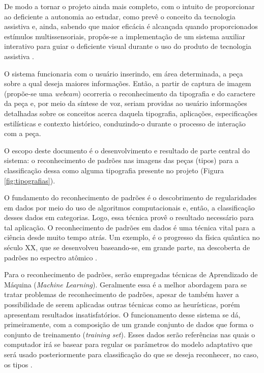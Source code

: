 De modo a tornar o projeto ainda mais completo, com o intuito de proporcionar ao deficiente a autonomia ao estudar, como prevê o conceito da tecnologia assistiva e, ainda, sabendo que maior eficácia é alcançada quando proporcionados estímulos multissensoriais, propôs-se a implementação de um sistema auxiliar interativo para guiar o deficiente visual durante o uso do produto de tecnologia assistiva .

O sistema funcionaria com o usuário inserindo, em área determinada, a peça sobre a qual deseja maiores informações. Então, a partir de captura de imagem (propõe-se uma \textit{webcam}) ocorreria o reconhecimento da tipografia e do caractere da peça e, por meio da síntese de voz, seriam providas ao usuário informações detalhadas sobre os conceitos acerca daquela tipografia, aplicações, especificações estilísticas e contexto histórico, conduzindo-o durante o processo de interação com a peça.

O escopo deste documento é o desenvolvimento e resultado de parte central do sistema: o reconhecimento de padrões nas imagens das peças (tipos) para a classificação dessa como alguma tipografia presente no projeto (Figura \ref{fig:tipografias}).

O fundamento do reconhecimento de padrões é o descobrimento de regularidades em dados por meio do uso de algoritmos computacionais e, então, a classificação desses dados em categorias. Logo, essa técnica provê o resultado necessário para tal aplicação. O reconhecimento de padrões em dados é uma técnica vital para a ciência desde muito tempo atrás. Um exemplo, é o progresso da física quântica no século XX, que se desenvolveu baseando-se, em grande parte, na descoberta de padrões no espectro atômico .

Para o reconhecimento de padrões, serão empregadas técnicas de Aprendizado de Máquina (\textit{Machine Learning}). Geralmente essa é a melhor abordagem para se tratar problemas de reconhecimento de padrões, apesar de também haver a possibilidade de serem aplicadas outras técnicas como as heurísticas, porém apresentam resultados insatisfatórios. O funcionamento desse sistema se dá, primeiramente, com a composição de um grande conjunto de dados que forma o conjunto de treinamento (\textit{training set}). Esses dados serão referências nas quais o computador irá se basear para regular os parâmetros do modelo adaptativo que será usado posteriormente para classificação do que se deseja reconhecer, no caso, os tipos .

